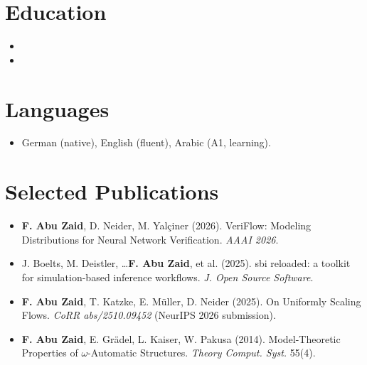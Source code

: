 \documentclass[11pt,a4paper,sans]{moderncv}
\begin{document}
\section{Education}
\vspace{1pt}
\begin{itemize}

\item{}

\vspace{3pt}

\item{}

\end{itemize}


\section{Languages}
\vspace{1pt}
\begin{itemize}
\item German (native), English (fluent), Arabic (A1, learning).
\end{itemize}


\section{Selected Publications}
\vspace{1pt}
\begin{itemize}
\item \textbf{F. Abu Zaid}, D. Neider, M. Yalçiner (2026). VeriFlow: Modeling Distributions for Neural Network Verification. \emph{AAAI 2026}.
\item J. Boelts, M. Deistler, \ldots \textbf{F. Abu Zaid}, et al. (2025). sbi reloaded: a toolkit for simulation-based inference workflows. \emph{J. Open Source Software}.
\item \textbf{F. Abu Zaid}, T. Katzke, E. Müller, D. Neider (2025). On Uniformly Scaling Flows. \emph{CoRR abs/2510.09452} (NeurIPS 2026 submission).
\item \textbf{F. Abu Zaid}, E. Grädel, L. Kaiser, W. Pakusa (2014). Model-Theoretic Properties of $\omega$-Automatic Structures. \emph{Theory Comput. Syst.} 55(4).
\end{itemize}
\end{document}
